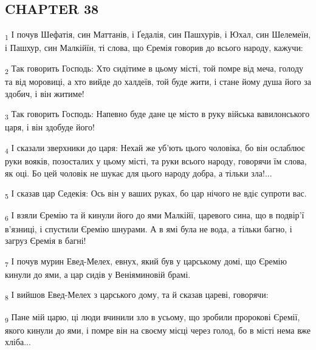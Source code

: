 \subsection{CHAPTER 38}
\begin{tcolorbox}
\textsubscript{1} І почув Шефатія, син Маттанів, і Ґедалія, син Пашхурів, і Юхал, син Шелемеїн, і Пашхур, син Малкійїн, ті слова, що Єремія говорив до всього народу, кажучи:
\end{tcolorbox}
\begin{tcolorbox}
\textsubscript{2} Так говорить Господь: Хто сидітиме в цьому місті, той помре від меча, голоду та від моровиці, а хто вийде до халдеїв, той буде жити, і стане йому душа його за здобич, і він житиме!
\end{tcolorbox}
\begin{tcolorbox}
\textsubscript{3} Так говорить Господь: Напевно буде дане це місто в руку війська вавилонського царя, і він здобуде його!
\end{tcolorbox}
\begin{tcolorbox}
\textsubscript{4} І сказали зверхники до царя: Нехай же уб'ють цього чоловіка, бо він ослаблює руки вояків, позосталих у цьому місті, та руки всього народу, говорячи їм слова, як оці. Бо цей чоловік не шукає для цього народу добра, а тільки зла!...
\end{tcolorbox}
\begin{tcolorbox}
\textsubscript{5} І сказав цар Седекія: Ось він у ваших руках, бо цар нічого не вдіє супроти вас.
\end{tcolorbox}
\begin{tcolorbox}
\textsubscript{6} І взяли Єремію та й кинули його до ями Малкійї, царевого сина, що в подвір'ї в'язниці, і спустили Єремію шнурами. А в ямі була не вода, а тільки багно, і загруз Єремія в багні!
\end{tcolorbox}
\begin{tcolorbox}
\textsubscript{7} І почув мурин Евед-Мелех, евнух, який був у царському домі, що Єремію кинули до ями, а цар сидів у Веніяминовій брамі.
\end{tcolorbox}
\begin{tcolorbox}
\textsubscript{8} І вийшов Евед-Мелех з царського дому, та й сказав цареві, говорячи:
\end{tcolorbox}
\begin{tcolorbox}
\textsubscript{9} Пане мій царю, ці люди вчинили зло в усьому, що зробили пророкові Єремії, якого кинули до ями, і помре він на своєму місці через голод, бо в місті нема вже хліба...
\end{tcolorbox}
